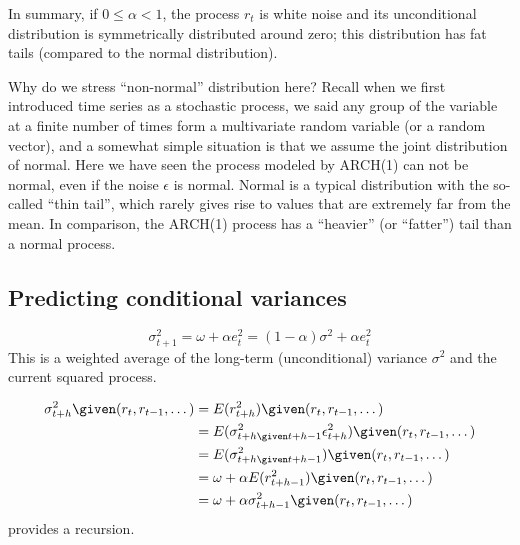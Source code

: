 \documentclass[12pt]{article}
\begin{document}
In summary,
if $0 \le \alpha < 1$, the process $r_t$ is white noise
and its unconditional distribution is symmetrically distributed
around zero; this distribution has fat tails (compared to the normal
distribution).


Why do we stress ``non-normal'' distribution here?
Recall when we first introduced time series as a stochastic process,
we said any group of the variable at a finite number of times
form a multivariate random variable (or a random vector),
and a somewhat simple situation is that we assume
the joint distribution of normal.
Here we have seen the process modeled by
ARCH(1) can not be normal, even if the noise $\epsilon$ is normal.
Normal is a typical distribution with the so-called ``thin tail'',
which rarely gives rise to values that are extremely far from the mean.
In comparison, the ARCH(1) process has a ``heavier'' (or ``fatter'')
tail than a normal process.


\subsection{Predicting conditional variances}

\[
\sigma_{t+1}^2
= \omega + \alpha e^2_{t}
= (1-\alpha) \sigma^2 + \alpha e^2_{t}
\]
This is a weighted average of the long-term (unconditional)
variance $\sigma^2$ and the current squared process.

\[\begin{split}
\sigma_{t+h}^2 \given (r_t, r_{t-1},\dotsc)
& = E(r^2_{t+h}) \given (r_t,r_{t-1},\dotsc)
\\
& = E(\sigma^2_{t+h\given t+h-1} \epsilon^2_{t+h})
    \given (r_t,r_{t-1},\dotsc)
\\
&= E(\sigma^2_{t+h\given t+h-1}) \given (r_t,r_{t-1},\dotsc)
\\
&= \omega + \alpha E(r^2_{t+h-1}) \given (r_t, r_{t-1},\dotsc)
\\
&= \omega + \alpha \sigma^2_{t+h-1} \given (r_t, r_{t-1},\dotsc)
\end{split}
\]
provides a recursion.
\end{document}
